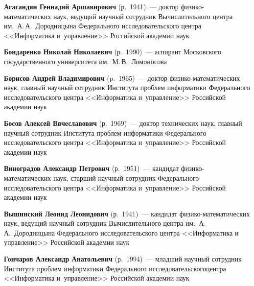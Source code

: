 \begin{multicols}{2}

\noindent
\textbf{Агасандян Геннадий Аршавирович} (р.\ 1941)~--- 
доктор фи\-зи\-ко-ма\-те\-ма\-ти\-че\-ских наук, ведущий научный со\-труд\-ник 
Вычислительного центра им.\ А.\,А.~Дородницына Федерального исследовательского 
цент\-ра <<Информатика и~управ\-ле\-ние>> Российской академии наук

\vspace*{2pt}

\noindent
\textbf{Бондаренко Николай Николаевич} (р.\ 1990)~--- аспирант 
Московского государственного университета им.\ М.\,В.~Ломоносова

\vspace*{2pt}


\noindent
\textbf{Борисов Андрей Владимирович} (p.\ 1965)~--- 
доктор фи\-зи\-ко-ма\-те\-ма\-ти\-че\-ских наук, главный научный 
сотрудник Института проб\-лем информатики Федерального исследовательского центра 
<<Информатика и~управ\-ле\-ние>> Российской академии наук

\vspace*{2pt}


\noindent
\textbf{Босов Алексей Вячеславович} (р.\ 1969)~--- 
доктор технических наук, главный научный сотрудник Института проб\-лем 
информатики Федерального исследовательского центра <<Информатика и~управ\-ле\-ние>>
 Российской академии наук
 
\vspace*{2pt}


 \noindent
\textbf{Виноградов Александр Петрович} (р.\ 1951)~--- кандидат фи\-зи\-ко-ма\-те\-ма\-ти\-че\-ских 
наук, старший научный сотрудник Федерального исследовательского центра 
<<Информатика и~управ\-ле\-ние>> Российской академии наук

\vspace*{2pt}


\noindent
\textbf{Вышинский Леонид Леонидович} (р.\ 1941)~--- 
кандидат фи\-зи\-ко-ма\-те\-ма\-ти\-че\-ских наук, ведущий научный сотрудник 
Вычислительного центра им.\
 А.\,А.~Дородницына Федерального исследовательского 
цент\-ра <<Информатика и управление>> Российской академии наук
 
\vspace*{2pt}


 \noindent
\textbf{Гончаров Александр Анатольевич} (р.\ 1994)~--- 
младший научный сотрудник Института проб\-лем информатики Федерального 
исследовательского\linebreak цент\-ра <<Информатика и~управ\-ле\-ние>> Российской академии наук


\end{multicols}
